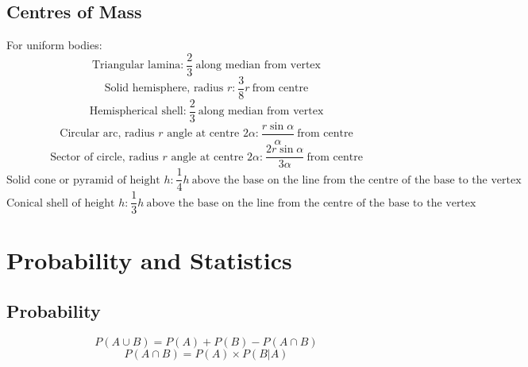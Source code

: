     \subsection{Centres of Mass}
    For uniform bodies: \\
    \begin{equation}
        \text{Triangular lamina:}\ \frac{2}{3}\ \text{along median from vertex}
    \end{equation}
    \begin{equation}
        \text{Solid hemisphere, radius }r\text{:}\ \frac{3}{8}r\ \text{from centre}
    \end{equation}
    \begin{equation}
        \text{Hemispherical shell:}\ \frac{2}{3}\ \text{along median from vertex}
    \end{equation}
    \begin{equation}
        \text{Circular arc, radius }r\text{ angle at centre }2\alpha\text{:}\ \frac{r\sin\alpha}{\alpha}\ \text{from centre}
    \end{equation}
    \begin{equation}
        \text{Sector of circle, radius }r\text{ angle at centre }2\alpha\text{:}\ \frac{2r\sin\alpha}{3\alpha}\ \text{from centre}
    \end{equation}
    \begin{equation}
        \text{Solid cone or pyramid of height }h\text{:}\ \frac{1}{4}h\ \text{above the base on the line from the centre of the base to the vertex}
    \end{equation}
    \begin{equation}
        \text{Conical shell of height }h\text{:}\ \frac{1}{3}h\ \text{above the base on the line from the centre of the base to the vertex}
    \end{equation}
\newpage

\section{Probability and Statistics}
\subsection{Probability}
\begin{equation}
    P(A\cup B)=P(A)+P(B)-P(A\cap B)
\end{equation}
\begin{equation}
    P(A\cap B)=P(A)\times P(B|A)
\end{equation}

